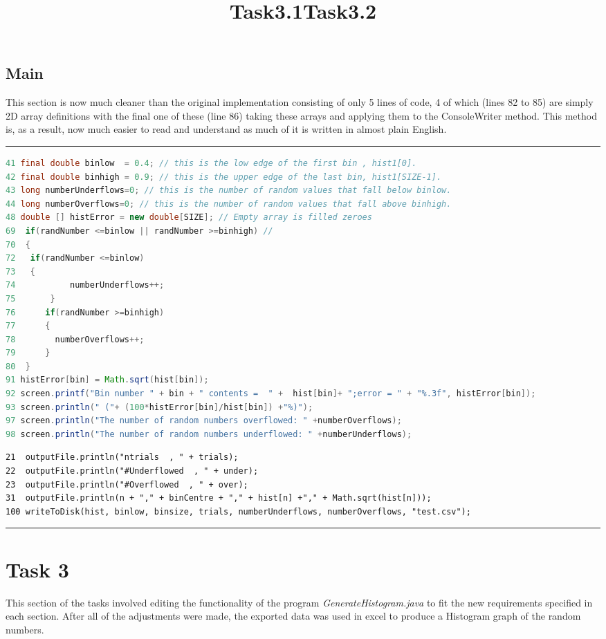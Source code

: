 \documentclass{article}
\begin{document}
\begin{multicols}{2}
			\subsection{Main}
			This section is now much cleaner than the original implementation consisting of only 5 lines of code, 4 of which (lines 82 to 85) are simply 2D array definitions with the final one of these (line 86) taking these arrays and applying them to the ConsoleWriter method. This method is, as a result, now much easier to read and understand as much of it is written in almost plain English.
\begin{table*}[t]
\hrule
\title{Task3.1}
\begin{lstlisting}[language=java, tabsize=1, showspaces=false, showstringspaces=false]
41 final double binlow  = 0.4; // this is the low edge of the first bin , hist1[0].       
42 final double binhigh = 0.9; // this is the upper edge of the last bin, hist1[SIZE-1].  
43 long numberUnderflows=0; // this is the number of random values that fall below binlow.
44 long numberOverflows=0; // this is the number of random values that fall above binhigh. 
48 double [] histError = new double[SIZE]; // Empty array is filled zeroes  
69  if(randNumber <=binlow || randNumber >=binhigh) // 
70  {
72 	 if(randNumber <=binlow)
73 	 {
74  		 numberUnderflows++;
75  	 }
76  	if(randNumber >=binhigh)
77  	{
78 		  numberOverflows++;
79  	}
80  }
91 histError[bin] = Math.sqrt(hist[bin]);
92 screen.printf("Bin number " + bin + " contents =  " +  hist[bin]+ ";error = " + "%.3f", histError[bin]);
93 screen.println(" ("+ (100*histError[bin]/hist[bin]) +"%)");               
97 screen.println("The number of random numbers overflowed: " +numberOverflows);
98 screen.println("The number of random numbers underflowed: " +numberUnderflows); 
\end{lstlisting}
\title{Task3.2}
\begin{lstlisting}
21  outputFile.println("ntrials  , " + trials); 
22  outputFile.println("#Underflowed  , " + under); 
23  outputFile.println("#Overflowed  , " + over); 
31  outputFile.println(n + "," + binCentre + "," + hist[n] +"," + Math.sqrt(hist[n]));
100 writeToDisk(hist, binlow, binsize, trials, numberUnderflows, numberOverflows, "test.csv"); 
\end{lstlisting}
\caption{These are the added lines of code for Tasks 3.1 and 3.2 }
\hrule
\end{table*}
\section{Task 3}
	This section of the tasks involved editing the functionality of the program \textit{GenerateHistogram.java} to fit the new requirements specified in each section. After all of the adjustments were made, the exported data was used in excel to produce a Histogram graph of the random numbers.

\end{multicols}
\end{document}
